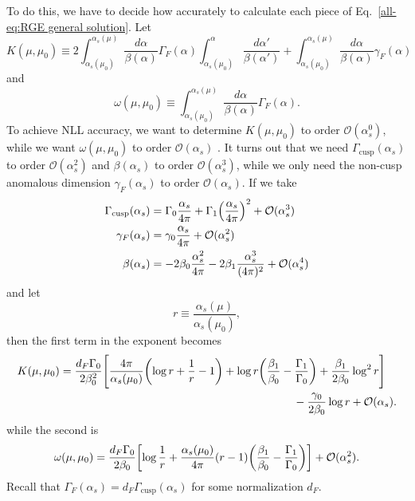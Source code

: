 \documentclass[../thesis.tex]{subfiles}
\providecommand{\cusp}{\mathrm{cusp}}
\providecommand{\cO}{\mathcal{O}}
\begin{document}
	To do this, we have to decide how accurately to calculate each piece of Eq.~\ref{all-eq:RGE general solution}. Let
	\begin{equation}
		K(\mu, \mu_0) \equiv 2 \int_{\alpha_s(\mu_0)}^{\alpha_s(\mu)} \frac{d\alpha}{\beta(\alpha)}\Gamma_F(\alpha) \int_{\alpha_s(\mu_0)}^\alpha \frac{d\alpha'}{\beta(\alpha')} + \int_{\alpha_s(\mu_0)}^{\alpha_s(\mu)} \frac{d\alpha}{\beta(\alpha)}\gamma_F(\alpha)
	\end{equation}
	and
	\begin{equation}
		\omega(\mu, \mu_0) \equiv \int_{\alpha_s(\mu_0)}^{\alpha_s(\mu)} \frac{d\alpha}{\beta(\alpha)}\Gamma_F(\alpha).
	\end{equation}
	To achieve NLL accuracy, we want to determine $K(\mu, \mu_0)$ to order $\cO(\alpha_s^0)$, while we want $\omega(\mu, \mu_0)$ to order $\cO(\alpha_s)$ \cite{frye_factorization_2016}. It turns out that we need $\Gamma_\cusp(\alpha_s)$ to order $\cO(\alpha_s^2)$ and $\beta(\alpha_s)$ to order $\cO(\alpha_s^3)$, while we only need the non-cusp anomalous dimension $\gamma_F(\alpha_s)$ to order $\cO(\alpha_s)$. If we take
	\begin{align}
		\Gamma_\cusp(\alpha_s) &= \Gamma_0 \frac{\alpha_s}{4\pi} + \Gamma_1 \qty(\frac{\alpha_s}{4\pi})^2 + \cO(\alpha_s^3) \\
		\gamma_F(\alpha_s) &= \gamma_0 \frac{\alpha_s}{4\pi} + \cO(\alpha_s^2) \\
		\beta(\alpha_s) &= -2\beta_0 \frac{\alpha_s^2}{4\pi} - 2\beta_1 \frac{\alpha_s^3}{(4\pi)^2} + \cO(\alpha_s^4)
	\end{align}
	and let
	\begin{equation}
		r \equiv \frac{\alpha_s(\mu)}{\alpha_s(\mu_0)},
	\end{equation}
	then the first term in the exponent becomes
	\begin{equation}\label{all-eq:NLL K function}
	\begin{aligned}
		K(\mu, \mu_0) = \frac{d_F \Gamma_0}{2\beta_0^2}\Bigg[\frac{4\pi}{\alpha_s(\mu_0)} \qty(\log r + \frac{1}{r} - 1) + \log r \qty(\frac{\beta_1}{\beta_0} - \frac{\Gamma_1}{\Gamma_0}) &+ \frac{\beta_1}{2\beta_0}\log^2 r \Bigg] \\
		&\hspace{-0.75cm}- \frac{\gamma_0}{2\beta_0} \log r + \cO(\alpha_s).
	\end{aligned}
	\end{equation}
	while the second is
	\begin{equation}\label{all-eq:NLL omega function}
		\omega(\mu, \mu_0) = \frac{d_F \Gamma_0}{2\beta_0}\qty[\log \frac{1}{r} + \frac{\alpha_s(\mu_0)}{4\pi}(r - 1)\qty(\frac{\beta_1}{\beta_0} - \frac{\Gamma_1}{\Gamma_0})] + \cO(\alpha_s^2).
	\end{equation}
	Recall that $\Gamma_F(\alpha_s) = d_F \Gamma_\cusp(\alpha_s)$ for some normalization $d_F$.
\end{document}
